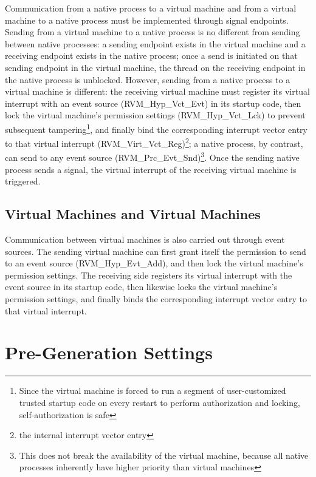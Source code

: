 Communication from a native process to a virtual machine and from a virtual machine to a native process must be implemented through signal endpoints. Sending from a virtual machine to a native process is no different from sending between native processes: a sending endpoint exists in the virtual machine and a receiving endpoint exists in the native process; once a send is initiated on that sending endpoint in the virtual machine, the thread on the receiving endpoint in the native process is unblocked. However, sending from a native process to a virtual machine is different: the receiving virtual machine must register its virtual interrupt with an event source (RVM\_Hyp\_Vct\_Evt) in its startup code, then lock the virtual machine's permission settings (RVM\_Hyp\_Vct\_Lck) to prevent subsequent tampering\footnote{Since the virtual machine is forced to run a segment of user-customized trusted startup code on every restart to perform authorization and locking, self-authorization is safe}, and finally bind the corresponding interrupt vector entry to that virtual interrupt (RVM\_Virt\_Vct\_Reg)\footnote{the internal interrupt vector entry}; a native process, by contrast, can send to any event source (RVM\_Prc\_Evt\_Snd)\footnote{This does not break the availability of the virtual machine, because all native processes inherently have higher priority than virtual machines}. Once the sending native process sends a signal, the virtual interrupt of the receiving virtual machine is triggered.

\subsection{Virtual Machines and Virtual Machines}\label{subsec:6-4-4}

Communication between virtual machines is also carried out through event sources. The sending virtual machine can first grant itself the permission to send to an event source (RVM\_Hyp\_Evt\_Add), and then lock the virtual machine's permission settings. The receiving side registers its virtual interrupt with the event source in its startup code, then likewise locks the virtual machine's permission settings, and finally binds the corresponding interrupt vector entry to that virtual interrupt.

\section{Pre-Generation Settings}\label{sec:6-5}

